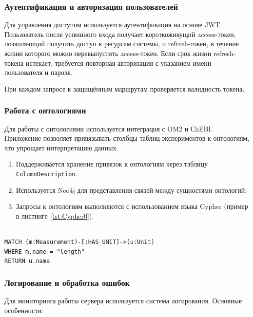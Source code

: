 \subsubsection{Аутентификация и авторизация пользователей}

Для управления доступом используется аутентификация на основе JWT. Пользователь после успешного входа получает короткоживущий access-токен, позволяющий получить доступ к ресурсам системы, и refresh-токен, в течение жизни которого можно перевыпустить access-токен. Если срок жизни refresh-токена истекает, требуется повторная авторизация с указанием имени пользователя и пароля.

При каждом запросе к защищённым маршрутам проверяется валидность токена.

\subsubsection{Работа с онтологиями}

Для работы с онтологиями используется интеграция с OM2 и СhEBI. Приложение позволяет привязывать столбцы таблиц экспериментов к онтологиям, что упрощает интерпретацию данных.

\begin{enumerate}
    \item Поддерживается хранение привязок к онтологиям через таблицу \texttt{ColumnDescription}.
    \item Используется Neo4j для представления связей между сущностями онтологий.
    \item Запросы к онтологиям выполняются с использованием языка Cypher (пример в листинге~\ref{lst:Cypher0}).
\end{enumerate}

\begin{lstlisting}[frame=single, basicstyle=\footnotesize\ttfamily, label={lst:Cypher0}, caption={Пример запроса к Neo4j для поиска онтологических связей},captionpos=b, breaklines=true, breakatwhitespace=true]

MATCH (m:Measurement)-[:HAS_UNIT]->(u:Unit)
WHERE m.name = "length"
RETURN u.name
\end{lstlisting}

\subsubsection{Логирование и обработка ошибок}

Для мониторинга работы сервера используется система логирования. Основные особенности:

